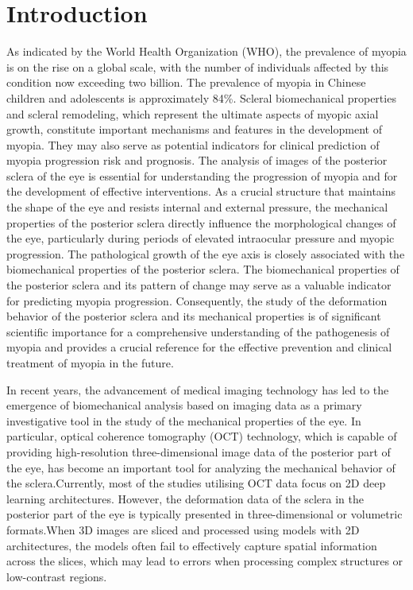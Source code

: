 \documentclass[AMA,Times1COL]{WileyNJDv5} %
\begin{document}
\section{Introduction}
As indicated by the World Health Organization (WHO), the prevalence of myopia is on the rise on a global scale, with the number of individuals affected by this condition now exceeding two billion. The prevalence of myopia in Chinese children and adolescents is approximately 84\%\cite{dong2020prevalence}. Scleral biomechanical properties and scleral remodeling, which represent the ultimate aspects of myopic axial growth, constitute important mechanisms and features in the development of myopia. They may also serve as potential indicators for clinical prediction of myopia progression risk and prognosis\cite{Cao2023}. The analysis of images of the posterior sclera of the eye is essential for understanding the progression of myopia and for the development of effective interventions. As a crucial structure that maintains the shape of the eye and resists internal and external pressure, the mechanical properties of the posterior sclera directly influence the morphological changes of the eye, particularly during periods of elevated intraocular pressure and myopic progression. The pathological growth of the eye axis is closely associated with the biomechanical properties of the posterior sclera. The biomechanical properties of the posterior sclera and its pattern of change may serve as a valuable indicator for predicting myopia progression\cite{Ding2015}. Consequently, the study of the deformation behavior of the posterior sclera and its mechanical properties is of significant scientific importance for a comprehensive understanding of the pathogenesis of myopia and provides a crucial reference for the effective prevention and clinical treatment of myopia in the future.

In recent years, the advancement of medical imaging technology has led to the emergence of biomechanical analysis based on imaging data as a primary investigative tool in the study of the mechanical properties of the eye\cite{li2022simultaneous, koprowski2017new}. In particular, optical coherence tomography (OCT) technology, which is capable of providing high-resolution three-dimensional image data of the posterior part of the eye, has become an important tool for analyzing the mechanical behavior of the sclera.Currently, most of the studies utilising OCT data focus on 2D deep learning architectures\cite{kugelman2019automatic, read2019choroidal}. However, the deformation data of the sclera in the posterior part of the eye is typically presented in three-dimensional or volumetric formats.When 3D images are sliced and processed using models with 2D architectures, the models often fail to effectively capture spatial information across the slices, which may lead to errors when processing complex structures or low-contrast regions.
\end{document}
